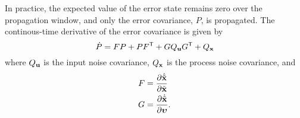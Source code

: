In practice, the expected
value of the error state remains zero over the propagation window, and only the
error covariance, $P$, is propagated.
The continous-time derivative of the error covariance is given by
\begin{equation}
  \dot{P} = FP + PF^{\mathsf{T}} + G Q_{\boldsymbol{\mathrm{u}}} G^{\mathsf{T}} + Q_{\boldsymbol{\mathrm{x}}}
\end{equation}
where $Q_{\boldsymbol{\mathrm{u}}}$ is the input noise covariance, $Q_{\boldsymbol{\mathrm{x}}}$ is the
process noise covariance, and
\begin{align}
  F &= \frac{ \partial \dot{\tilde{\boldsymbol{\mathrm{x}}}} }{ \partial \tilde{\boldsymbol{\mathrm{x}}} } \\
  G &= \frac{ \partial \dot{\tilde{\boldsymbol{\mathrm{x}}}} }{ \partial \boldsymbol{\mathrm{\upsilon}} } .
\end{align}
